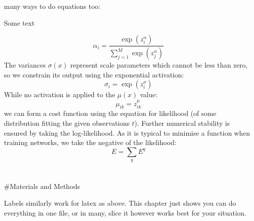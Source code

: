 \documentclass[
  a4paper,
  twoside]{uoe-thesis-template}
\begin{document}
\begin{tcolorbox}[enhanced jigsaw, opacitybacktitle=0.6, colbacktitle=quarto-callout-note-color!10!white, colframe=quarto-callout-note-color-frame, leftrule=.75mm, bottomtitle=1mm, toptitle=1mm, toprule=.15mm, colback=white, left=2mm, titlerule=0mm, opacityback=0, rightrule=.15mm, arc=.35mm, title=\textcolor{quarto-callout-note-color}{\faInfo}\hspace{0.5em}{Note}, bottomrule=.15mm, coltitle=black, breakable]

many ways to do equations too:

\end{tcolorbox}

Some text

\begin{equation}
\alpha_i=\frac{\exp \left(z_i^\alpha\right)}{\sum_{j=1}^M \exp \left(z_j^\alpha\right)}
\end{equation}
The variances $\sigma(x)$ represent scale parameters which cannot be less than zero, so we constrain its output using the exponential activation:
\begin{equation}
\sigma_i=\exp \left(z_i^\sigma\right)
\end{equation}
While no activation is applied to the $\mu(x)$ value:
\begin{equation}
\mu_{i k}=z_{i k}^\mu
\end{equation}
we can form a cost function using the equation for likelihood (of some distribution fitting the given observations $t$). Further numerical stability is ensured by taking the log-likelihood. As it is typical to minimise a function when training networks, we take the negative of the likelihood:  
\begin{equation}
E=\sum_q E^q
\end{equation}


\chapter{}\label{section}

\#Materials and Methods

\begin{tcolorbox}[enhanced jigsaw, opacitybacktitle=0.6, colbacktitle=quarto-callout-note-color!10!white, colframe=quarto-callout-note-color-frame, leftrule=.75mm, bottomtitle=1mm, toptitle=1mm, toprule=.15mm, colback=white, left=2mm, titlerule=0mm, opacityback=0, rightrule=.15mm, arc=.35mm, title=\textcolor{quarto-callout-note-color}{\faInfo}\hspace{0.5em}{Note}, bottomrule=.15mm, coltitle=black, breakable]

Labels similarly work for latex as above. This chapter just shows you
can do everything in one file, or in many, slice it however works best
for your situation.

\end{tcolorbox}
\end{document}
